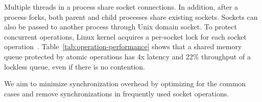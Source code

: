Multiple threads in a process share socket connections. In addition, after a process forks, both parent and child processes share existing sockets. Sockets can also be passed to another process through Unix domain socket. To protect concurrent operations, Linux kernel acquires a per-socket lock for each socket operation~\cite{boyd2010analysis,han2012megapipe,lin2016scalable}. Table~\ref{tab:operation-performance} shows that a shared memory queue protected by atomic operations has 4x latency and 22\% throughput of a lockless queue, even if there is no contention.

We aim to minimize synchronization overhead by optimizing for the common cases and remove synchronizations in frequently used socket operations.







